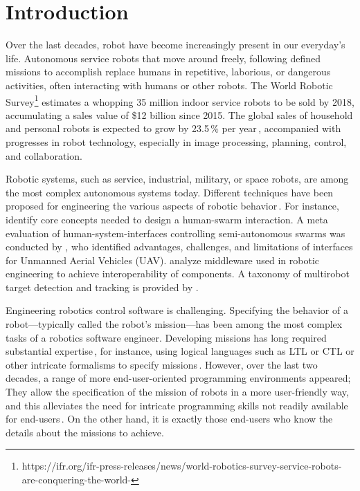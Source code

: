 \section{Introduction}
Over the last decades, robot have become increasingly present in our everyday's life. Autonomous service robots that move around freely, following defined missions to accomplish replace humans in repetitive, laborious, or dangerous activities, often interacting with humans or other robots. The World Robotic Survey\footnote{https://ifr.org/ifr-press-releases/news/world-robotics-survey-service-robots-are-conquering-the-world-} estimates a whopping 35 million indoor service robots to be sold by 2018, accumulating a sales value of \$12 billion since 2015. The global sales of household and personal robots is expected to grow by 23.5\,\% per year\,\cite{sheng:online}, accompanied with progresses in robot technology, especially in image processing, planning, control, and collaboration.

Robotic systems, such as service, industrial, military, or space robots, are among the most complex autonomous systems today. Different techniques have been proposed for engineering the various aspects of robotic behavior\,\cite{Fernandez-Perdomo2010,DiRuscio2014,Doherty2013,AtrickD..Ulam2010}. For instance, \citet{Kolling2016} identify core concepts needed to design a human-swarm interaction. A meta evaluation of human-system-interfaces controlling semi-autonomous swarms was conducted by \citet{Hocraffer2017}, who identified advantages, challenges, and limitations of interfaces for Unmanned Aerial Vehicles (UAV). \citet{Mohamed2008} analyze middleware used in robotic engineering to achieve interoperability of components. A taxonomy of multirobot target detection and tracking is provided by \citet{Robin2016}.

Engineering robotics control software is challenging. Specifying the behavior of a robot---typically called the robot's mission---has been among the most complex tasks of a robotics software engineer. Developing missions has long required substantial expertise\,\cite{Brugali2009,Aragao2016}, for instance, using logical languages such as LTL or CTL or other intricate formalisms to specify missions\,\cite{Luckcuck2018}.
However, over the last two decades, a range of more end-user-oriented programming environments appeared; They allow the specification of the mission of robots in a more user-friendly way, and this alleviates the need for intricate programming skills not readily available for end-users\,\cite{Weintrop2018,Bozhinoski2016b}. On the other hand, it is exactly those end-users who know the details about the missions to achieve.

